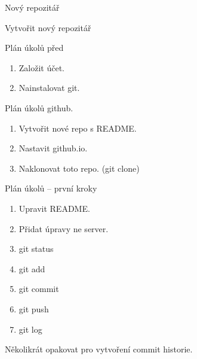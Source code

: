 \documentclass[14pt]{beamer}
\begin{document}
	\begin{frame}{Nový repozitář}
	\begin{center}
	\end{center}
	\end{frame}

	\begin{frame}{Vytvořit nový repozitář}
	\begin{center}
	\end{center}
	\end{frame}


	\begin{frame}{Plán úkolů před}
		\begin{enumerate}
		\item Založit účet.
		\item Nainstalovat git.
	\end{enumerate}
	\end{frame}

	\begin{frame}{Plán úkolů github.}
		\begin{enumerate}
			\item Vytvořit nové repo s README.
			\item Nastavit github.io.
			\item Naklonovat toto repo. (git clone)
		\end{enumerate}
	\end{frame}
	
	\begin{frame}{Plán úkolů -- první kroky}
	\begin{enumerate}
		\item Upravit README.
		\item Přidat úpravy ne server.
		\item git status
		\item git add
		\item git commit
		\item git push
		\item git log
	\end{enumerate}
   Několikrát opakovat pro vytvoření commit historie.
	\end{frame}
\end{document}
